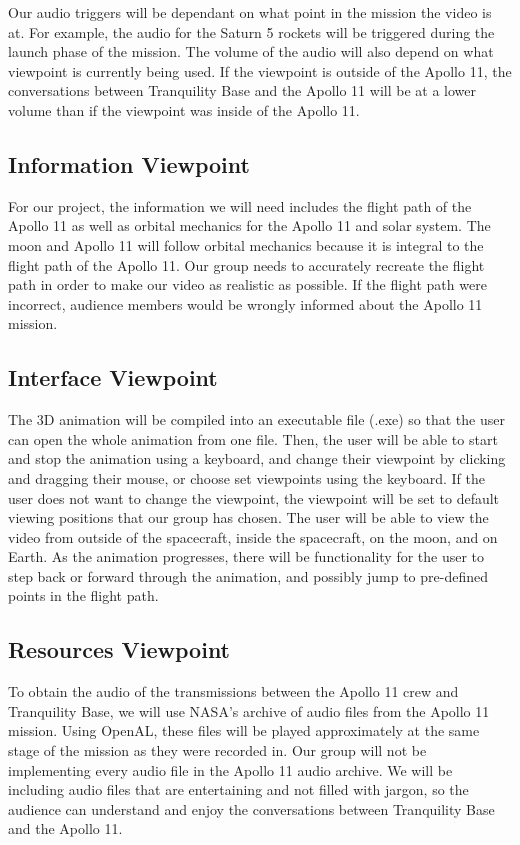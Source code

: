 \documentclass[onecolumn, draftclsnofoot,10pt, compsoc]{IEEEtran}
\begin{document}
    Our audio triggers will be dependant on what point in the mission the video is at. For example, the audio for the Saturn 5 rockets will be triggered during the launch phase of the mission. The volume of the audio will also depend on what viewpoint is currently being used. If the viewpoint is outside of the Apollo 11, the conversations between Tranquility Base and the Apollo 11 will be at a lower volume than if the viewpoint was inside of the Apollo 11.
    
    \subsection{Information Viewpoint}
    For our project, the information we will need includes the flight path of the Apollo 11 as well as orbital mechanics for the Apollo 11 and solar system. The moon and Apollo 11 will follow orbital mechanics because it is integral to the flight path of the Apollo 11. Our group needs to accurately recreate the flight path in order to make our video as realistic as possible. If the flight path were incorrect, audience members would be wrongly informed about the Apollo 11 mission.

    \subsection{Interface Viewpoint}
       
       The 3D animation will be compiled into an executable file (.exe) so that the user can open the whole animation from one file. Then, the user will be able to start and stop the animation using a keyboard, and change their viewpoint by clicking and dragging their mouse, or choose set viewpoints using the keyboard. If the user does not want to change the viewpoint, the viewpoint will be set to default viewing positions that our group has chosen. The user will be able to view the video from outside of the spacecraft, inside the spacecraft, on the moon, and on Earth. As the animation progresses, there will be functionality for the user to step back or forward through the animation, and possibly jump to pre-defined points in the flight path.
    
    \subsection{Resources Viewpoint}
    To obtain the audio of the transmissions between the Apollo 11 crew and Tranquility Base, we will use NASA's archive of audio files from the Apollo 11 mission. Using OpenAL, these files will be played approximately at the same stage of the mission as they were recorded in. Our group will not be implementing every audio file in the Apollo 11 audio archive. We will be including audio files that are entertaining and not filled with jargon, so the audience can understand and enjoy the conversations between Tranquility Base and the Apollo 11.
    
\end{document}
